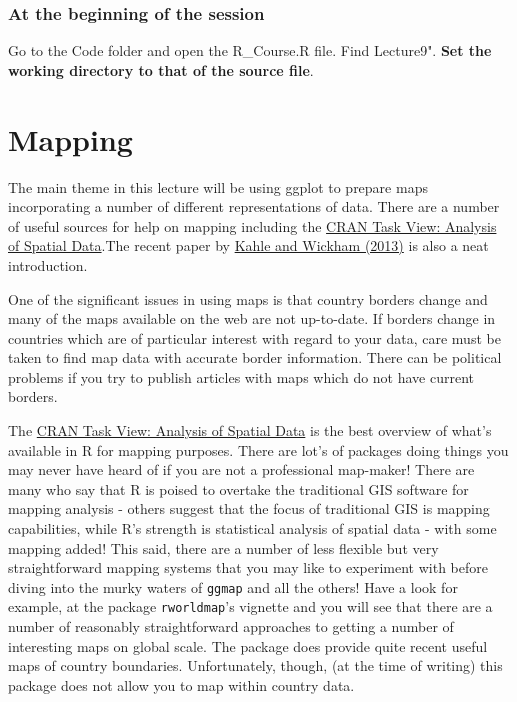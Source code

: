 \documentclass[titlepage]{book}\usepackage{knitr}
\begin{document}
\subsubsection{At the beginning of the session}

Go to the Code folder and open the R\_Course.R file.  Find Lecture9".
\textbf{Set the working directory to that of the source file}.


\section{Mapping}



The main theme in this lecture will be using ggplot to prepare maps incorporating a number of different representations of data. There are a number of useful sources for help on mapping including the \href{http://cran.r-project.org/web/views/Spatial.html}{CRAN Task View: Analysis of Spatial Data}.The recent paper by \href{http://journal.r-project.org/archive/2013-1/kahle-wickham.pdf}{Kahle and Wickham (2013)}\cite{Kahle2013} is also a neat introduction.

One of the significant issues in using maps is that country borders change and many of the maps available on the web are not up-to-date. If borders change in countries which are of particular interest with regard to your data, care must be taken to find map data with accurate border information.  There can be political problems if you try to publish articles with maps which do not have current borders.

The \href{http://cran.r-project.org/web/views/Spatial.html}{CRAN Task View: Analysis of Spatial Data} is the best overview of what's available in R for mapping purposes. There are lot's of packages doing things you may never have heard of if you are not a professional map-maker! There are many who say that R is poised to overtake the traditional GIS software for mapping analysis - others suggest that the focus of traditional GIS is mapping capabilities, while R's strength is statistical analysis of spatial data - with some mapping added! 
This said, there are a number of less flexible but very straightforward mapping systems that you may like to experiment with before diving into the murky waters of \texttt{ggmap} and all the others! Have a look for example, at the package \texttt{rworldmap}'s vignette and you will see that there are a number of reasonably straightforward approaches to getting a number of interesting maps on global scale. The package does provide quite recent useful maps of country boundaries. Unfortunately, though, (at the time of writing) this package does not allow you to map within country data.
\end{document}
